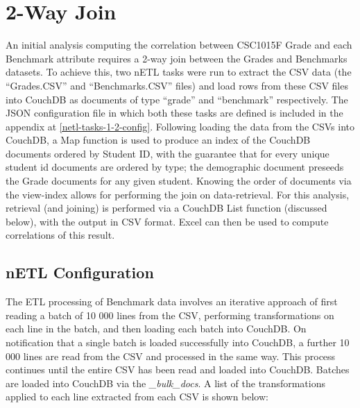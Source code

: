 \section{2-Way Join}
An initial analysis computing the correlation between CSC1015F Grade and each Benchmark attribute requires a 2-way join between the Grades and Benchmarks datasets. To achieve this, two nETL tasks were run to extract the CSV data (the ``Grades.CSV'' and ``Benchmarks.CSV'' files) and load rows from these CSV files into CouchDB as documents of type ``grade'' and ``benchmark'' respectively. The JSON configuration file in which both these tasks are defined is included in the appendix at \ref{netl-tasks-1-2-config}. Following loading the data from the CSVs into CouchDB, a Map function is used to produce an index of the CouchDB documents ordered by Student ID, with the guarantee that for every unique student id documents are ordered by type; the demographic document preseeds the Grade documents for any given student. Knowing the order of documents via the view-index allows for performing the join on data-retrieval. For this analysis, retrieval (and joining) is performed via a CouchDB List function (discussed below), with the output in CSV format. Excel can then be used to compute correlations of this result.

\subsection{nETL Configuration}
The ETL processing of Benchmark data involves an iterative approach of first reading a batch of 10 000 lines from the CSV, performing transformations on each line in the batch, and then loading each batch into CouchDB. On notification that a single batch is loaded successfully into CouchDB, a further 10 000 lines are read from the CSV and processed in the same way. This process continues until the entire CSV has been read and loaded into CouchDB. Batches are loaded into CouchDB via the \textit{\_bulk\_docs}. A list of the transformations applied to each line extracted from each CSV is shown below:

